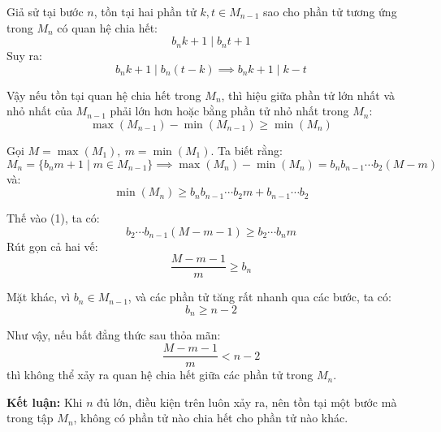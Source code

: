 \documentclass[../01-divisibility.tex]{subfiles}
\begin{document}
\begin{soln}\footnotemark
	Giả sử tại bước \( n \), tồn tại hai phần tử \( k, t \in M_{n-1} \) sao cho phần tử tương ứng trong \( M_n \) có quan hệ chia hết:
	\[
		b_n k + 1 \mid b_n t + 1
	\]
	Suy ra:
	\[
		b_n k + 1 \mid b_n(t - k) \implies b_n k + 1 \mid k - t
	\]

	Vậy nếu tồn tại quan hệ chia hết trong \( M_n \), thì hiệu giữa phần tử lớn nhất và nhỏ nhất của \( M_{n-1} \) phải lớn hơn hoặc bằng phần tử nhỏ nhất trong \( M_n \):
	\[
		\max(M_{n-1}) - \min(M_{n-1}) \geq \min(M_n) \tag{1}
	\]

	Gọi \( M = \max(M_1),\ m = \min(M_1) \). Ta biết rằng:
	\[
		M_n = \{ b_n m + 1 \mid m \in M_{n-1} \}
	\implies \max(M_n) - \min(M_n) = b_n b_{n-1} \cdots b_2 (M - m)
	\]
	và:
	\[
		\min(M_n) \geq b_n b_{n-1} \cdots b_2 m + b_{n-1} \cdots b_2
	\]

	Thế vào (1), ta có:
	\[
		b_2 \cdots b_{n-1} (M - m - 1) \geq b_2 \cdots b_n m
	\]
	Rút gọn cả hai vế:
	\[
		\frac{M - m - 1}{m} \geq b_n
	\]

	Mặt khác, vì \( b_n \in M_{n-1} \), và các phần tử tăng rất nhanh qua các bước, ta có:
	\[
		b_n \geq n - 2
	\]

	Như vậy, nếu bất đẳng thức sau thỏa mãn:
	\[
		\frac{M - m - 1}{m} < n - 2
	\]
	thì không thể xảy ra quan hệ chia hết giữa các phần tử trong \( M_n \).

	\textbf{Kết luận:} Khi \( n \) đủ lớn, điều kiện trên luôn xảy ra, nên tồn tại một bước mà trong tập \( M_n \), không có phần tử nào chia hết cho phần tử nào khác.
\end{soln}

\end{document}
